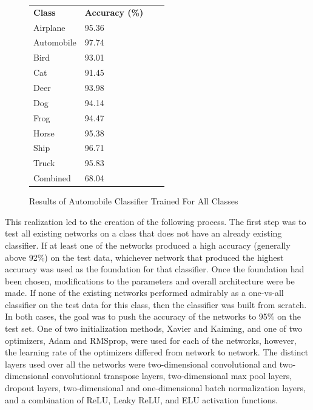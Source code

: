 \documentclass[10pt,twocolumn,letterpaper]{article}
\begin{document}
\begin{figure}[H]
	\begin{table}[H]
	\centering
		\begin{tabular}{llll}
			\textbf{Class} & \textbf{Accuracy (\%)} & \textbf{} & \textbf{} \\
			Airplane       & 95.36                  &           &           \\
			Automobile     & 97.74                  &           &           \\
			Bird           & 93.01                  &           &           \\
			Cat            & 91.45                  &           &           \\
			Deer           & 93.98                  &           &           \\
			Dog            & 94.14                  &           &           \\
			Frog           & 94.47                  &           &           \\
			Horse          & 95.38                  &           &           \\
			Ship           & 96.71                  &           &           \\
			Truck          & 95.83                  &           &           \\
			Combined       & 68.04                  &           &          
		\end{tabular}
	\end{table}
	\caption{Results of Automobile Classifier Trained For All Classes}
\end{figure}

This realization led to the creation of the following process. The first step was to test all existing networks on a class that does not have an already existing classifier. If at least one of the networks produced a high accuracy (generally above 92\%) on the test data, whichever network that produced the highest accuracy was used as the foundation for that classifier. Once the foundation had been chosen, modifications to the parameters and overall architecture were be made. If none of the existing networks performed admirably as a one-vs-all classifier on the test data for this class, then the classifier was built from scratch. In both cases, the goal was to push the accuracy of the networks to 95\% on the test set. One of two initialization methods, Xavier and Kaiming, and one of two optimizers, Adam and RMSprop, were used for each of the networks, however, the learning rate of the optimizers differed from network to network. The distinct layers used over all the networks were two-dimensional convolutional and two-dimensional convolutional transpose layers, two-dimensional max pool layers, dropout layers, two-dimensional and one-dimensional batch normalization layers, and a combination of ReLU, Leaky ReLU, and ELU activation functions.
\end{document}
